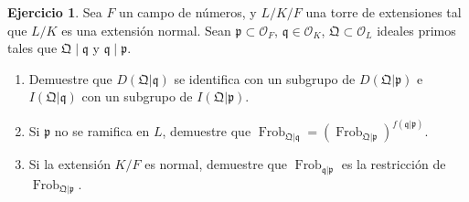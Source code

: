 \documentclass{article}
\newcounter{tarea}
\theoremstyle{definition}
\newtheorem{ejercicio}{Ejercicio}[tarea]
\DeclareMathOperator{\Frob}{Frob}
\renewcommand{\O}{\mathcal{O}}
\begin{document}
\begin{ejercicio}
  Sea $F$ un campo de números, y $L/K/F$ una torre de extensiones tal que $L/K$
  es una extensión normal. Sean $\mathfrak{p} \subset \O_F$,
  $\mathfrak{q} \in \O_K$, $\mathfrak{Q} \subset \O_L$ ideales primos tales que
  $\mathfrak{Q} \mid \mathfrak{q}$ y $\mathfrak{q}\mid\mathfrak{p}$.

  \begin{enumerate}
  \item[1)] Demuestre que $D (\mathfrak{Q}|\mathfrak{q})$ se identifica con un
    subgrupo de $D (\mathfrak{Q}|\mathfrak{p})$ e
    $I (\mathfrak{Q}|\mathfrak{q})$ con un subgrupo de
    $I (\mathfrak{Q}|\mathfrak{p})$.

  \item[2)] Si $\mathfrak{p}$ no se ramifica en $L$, demuestre que
    $\Frob_{\mathfrak{Q}|\mathfrak{q}} = (\Frob_{\mathfrak{Q}|\mathfrak{p}})^{f (\mathfrak{q}|\mathfrak{p})}$.

  \item[3)] Si la extensión $K/F$ es normal, demuestre que
    $\Frob_{\mathfrak{q}|\mathfrak{p}}$ es la restricción de
    $\Frob_{\mathfrak{Q}|\mathfrak{p}}$.
  \end{enumerate}


\end{ejercicio}
\end{document}
